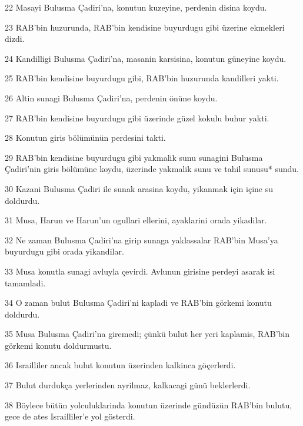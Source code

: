 \par 22 Masayi Bulusma Çadiri'na, konutun kuzeyine, perdenin disina koydu.
\par 23 RAB'bin huzurunda, RAB'bin kendisine buyurdugu gibi üzerine ekmekleri dizdi.
\par 24 Kandilligi Bulusma Çadiri'na, masanin karsisina, konutun güneyine koydu.
\par 25 RAB'bin kendisine buyurdugu gibi, RAB'bin huzurunda kandilleri yakti.
\par 26 Altin sunagi Bulusma Çadiri'na, perdenin önüne koydu.
\par 27 RAB'bin kendisine buyurdugu gibi üzerinde güzel kokulu buhur yakti.
\par 28 Konutun giris bölümünün perdesini takti.
\par 29 RAB'bin kendisine buyurdugu gibi yakmalik sunu sunagini Bulusma Çadiri'nin giris bölümüne koydu, üzerinde yakmalik sunu ve tahil sunusu* sundu.
\par 30 Kazani Bulusma Çadiri ile sunak arasina koydu, yikanmak için içine su doldurdu.
\par 31 Musa, Harun ve Harun'un ogullari ellerini, ayaklarini orada yikadilar.
\par 32 Ne zaman Bulusma Çadiri'na girip sunaga yaklassalar RAB'bin Musa'ya buyurdugu gibi orada yikandilar.
\par 33 Musa konutla sunagi avluyla çevirdi. Avlunun girisine perdeyi asarak isi tamamladi.
\par 34 O zaman bulut Bulusma Çadiri'ni kapladi ve RAB'bin görkemi konutu doldurdu.
\par 35 Musa Bulusma Çadiri'na giremedi; çünkü bulut her yeri kaplamis, RAB'bin görkemi konutu doldurmustu.
\par 36 Israilliler ancak bulut konutun üzerinden kalkinca göçerlerdi.
\par 37 Bulut durdukça yerlerinden ayrilmaz, kalkacagi günü beklerlerdi.
\par 38 Böylece bütün yolculuklarinda konutun üzerinde gündüzün RAB'bin bulutu, gece de ates Israilliler'e yol gösterdi.


